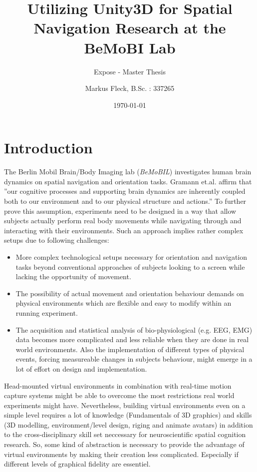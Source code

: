 \documentclass[	DIV=calc, paper=a4,	fontsize=11pt, twocolumn]{scrartcl}
\title{Utilizing Unity3D for Spatial Navigation Research at the BeMoBI Lab}
\subtitle{Expose - Master Thesis}
\author{Markus Fleck, B.Sc. : 337265}
\date{\today}
\newcommand{\cItemSpacing}{0.05em}
\begin{document}
 

\maketitle

\begin{abstract}
\end{abstract}

\section*{Introduction}
The Berlin Mobil Brain/Body Imaging lab (\emph{BeMoBIL}) investigates human brain dynamics on spatial navigation and orientation tasks. Gramann et.al.\nocite{gramann2014imaging} affirm that ''our cognitive processes and supporting brain dynamics are inherently coupled both to our environment and to our physical structure and actions.'' To further prove this assumption, experiments need to be designed in a way that allow subjects actually perform real body movements while navigating through and interacting with their environments. Such an approach implies rather complex setups due to following challenges:
\begin{itemize} 
\setlength\itemsep{\cItemSpacing}
	\item More complex technological setups necessary for orientation and navigation tasks beyond conventional approaches of subjects looking to a screen while lacking the opportunity of movement. 
	\item The possibility of actual movement and orientation behaviour demands on physical environments which are flexible and easy to modify within an running experiment. 
	\item The acquisition and statistical analysis of bio-physiological (e.g. EEG, EMG) data becomes more complicated and less reliable when they are done in real world environments. Also the implementation of different types of physical events, forcing measureable changes in subjects behaviour, might emerge in a lot of effort on design and implementation. 
\end{itemize}
Head-mounted virtual environments in combination with real-time motion capture systems might be able to overcome the most restrictions real world experiments might have.\cite{bohil2011virtual} 
Nevertheless, building virtual environments even on a simple level requires a lot of knowledge (Fundamentals of 3D graphics) and skills (3D modelling, environment/level design, riging and animate avatars) in addition to the cross-disciplinary skill set neccessary for neuroscientific spatial cognition research. So, some kind of abstraction is necessary to provide the advantage of virtual environments by making their creation less complicated. Especially if different levels of graphical fidelity are essentiel. 
\end{document}
